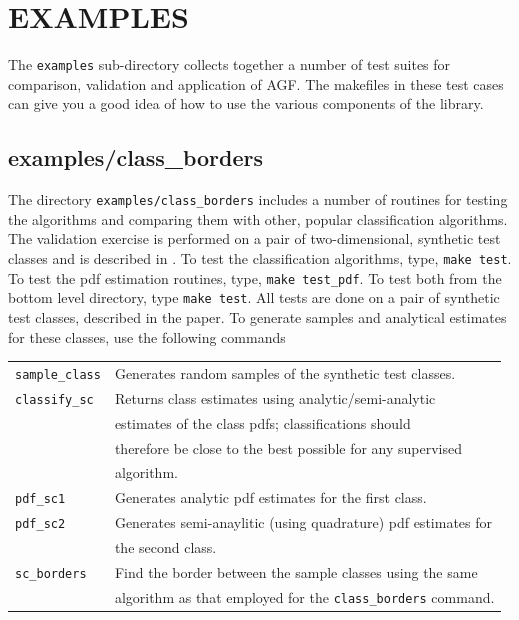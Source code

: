 \documentclass[12pt]{article}
\begin{document}
\section{EXAMPLES}

\label{EXAMPLES}

  The \verb"examples" sub-directory collects together a number of test suites for comparison, validation and application of AGF.  The makefiles in these test cases can give you a good idea of how to use the various components of the library.

\subsection{examples/class\_borders}

The directory \verb"examples/class_borders" includes a number of routines for testing the algorithms and comparing them with other, popular classification algorithms.  The validation exercise is performed on a pair of two-dimensional, synthetic test classes and is described in \citet{Mills2011}.  To test the classification algorithms, type, \verb"make test".  To test the pdf estimation routines, type, \verb"make test_pdf".  To test both from the bottom level directory, type \verb"make test".  All tests are done on a pair of synthetic test classes, described in the paper.  To generate samples and analytical estimates for these classes, use the following commands

\begin{tabular}{ll}
\verb/sample_class/ & Generates random samples of the synthetic test classes.\\
\verb/classify_sc/ & Returns class estimates using analytic/semi-analytic \\
		   & estimates of the class pdfs; classifications should \\
		     & therefore be close to the best possible for any supervised \\
       & algorithm.\\
\verb/pdf_sc1/ & Generates analytic pdf estimates for the first class.\\
\verb/pdf_sc2/ & Generates semi-anaylitic (using quadrature) pdf estimates for \\
	       & the second class.\\
\verb/sc_borders/ & Find the border between the sample classes using the same \\
		  & algorithm as that employed for the \verb"class_borders" command.
\end{tabular}
\end{document}
